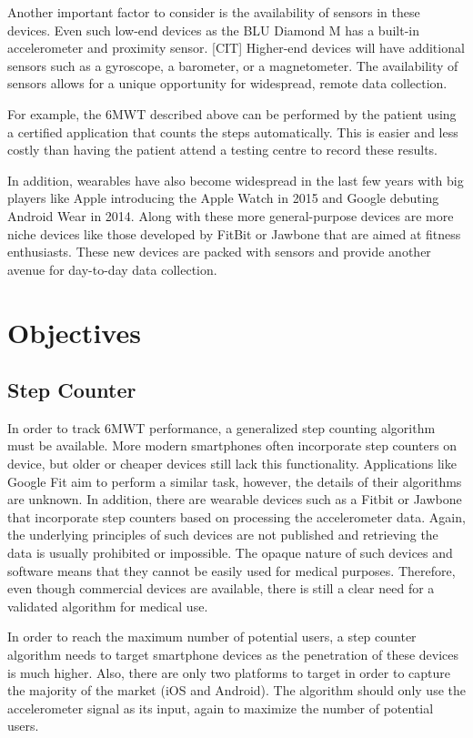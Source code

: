             Another important factor to consider is the availability of sensors in these devices. Even such low-end devices as the BLU Diamond M has a built-in accelerometer and proximity sensor. [CIT] Higher-end devices will have additional sensors such as a gyroscope, a barometer, or a magnetometer. The availability of sensors allows for a unique opportunity for widespread, remote data collection. 

            For example, the 6MWT described above can be performed by the patient using a certified application that counts the steps automatically. This is easier and less costly than having the patient attend a testing centre to record these results.

            In addition, wearables have also become widespread in the last few years with big players like Apple introducing the Apple Watch in 2015 and Google debuting Android Wear in 2014. Along with these more general-purpose devices are more niche devices like those developed by FitBit or Jawbone that are aimed at fitness enthusiasts. These new devices are packed with sensors and provide another avenue for day-to-day data collection.

    \chapter{Objectives}

        \section{Step Counter}

            In order to track 6MWT performance, a generalized step counting algorithm must be available. More modern smartphones often incorporate step counters on device, but older or cheaper devices still lack this functionality. Applications like Google Fit aim to perform a similar task, however, the details of their algorithms are unknown. In addition, there are wearable devices such as a Fitbit or Jawbone that incorporate step counters based on processing the accelerometer data. Again, the underlying principles of such devices are not published and retrieving the data is usually prohibited or impossible. The opaque nature of such devices and software means that they cannot be easily used for medical purposes. Therefore, even though commercial devices are available, there is still a clear need for a validated algorithm for medical use.

            In order to reach the maximum number of potential users, a step counter algorithm needs to target smartphone devices as the penetration of these devices is much higher. Also, there are only two platforms to target in order to capture the majority of the market (iOS and Android). The algorithm should only use the accelerometer signal as its input, again to maximize the number of potential users.

